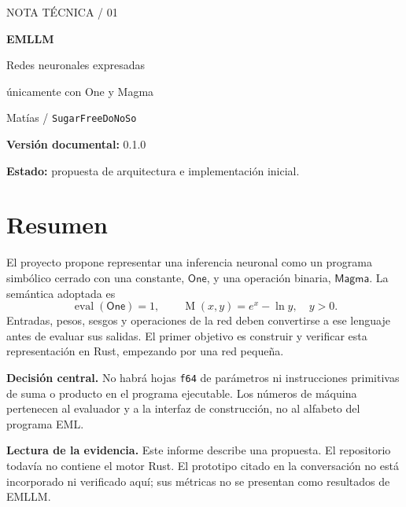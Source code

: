 \documentclass[11pt,a4paper]{article}
\newcommand{\M}{\operatorname{M}}
\newcommand{\One}{\mathsf{One}}
\newcommand{\Magma}{\mathsf{Magma}}
\begin{document}
\thispagestyle{empty}
{\color{accent}\large NOTA TÉCNICA / 01}\par
\vspace{10mm}
{\color{ink}\Huge\bfseries EMLLM}\par
\vspace{4mm}
{\color{ink}\LARGE Redes neuronales expresadas\par únicamente con One y Magma}\par
\vspace{6mm}
{\large Matías / \texttt{SugarFreeDoNoSo}}\par
\textbf{Versión documental:} 0.1.0\par
\textbf{Estado:} propuesta de arquitectura e implementación inicial.

\vspace{5mm}
\section*{Resumen}
El proyecto propone representar una inferencia neuronal como un programa
simbólico cerrado con una constante, \(\One\), y una operación binaria,
\(\Magma\). La semántica adoptada es
\[
  \operatorname{eval}(\One)=1,\qquad
  \M(x,y)=e^x-\ln y,\quad y>0.
\]
Entradas, pesos, sesgos y operaciones de la red deben convertirse a ese
lenguaje antes de evaluar sus salidas. El primer objetivo es construir y
verificar esta representación en Rust, empezando por una red pequeña.

\begin{center}
\end{center}

\textbf{Decisión central.} No habrá hojas \texttt{f64} de parámetros ni
instrucciones primitivas de suma o producto en el programa ejecutable.
Los números de máquina pertenecen al evaluador y a la interfaz de construcción,
no al alfabeto del programa EML.

\textbf{Lectura de la evidencia.} Este informe describe una propuesta.
El repositorio todavía no contiene el motor Rust. El prototipo citado en
la conversación no está incorporado ni verificado aquí; sus métricas no
se presentan como resultados de EMLLM.
\end{document}

